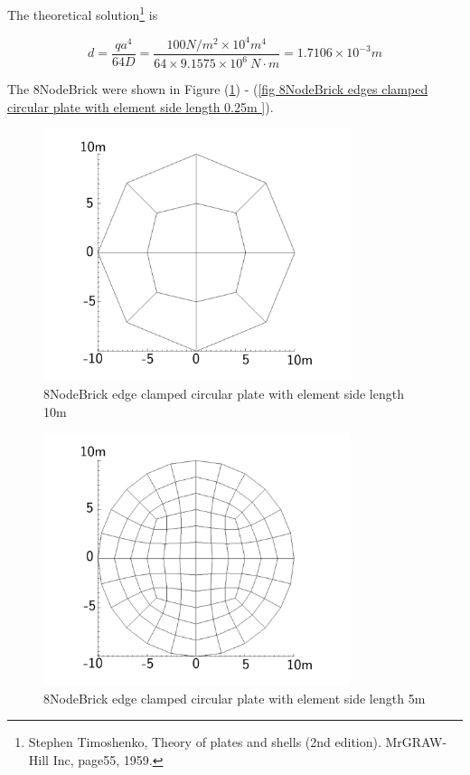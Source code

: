 \documentclass[fleqn,11pt]{article}
\begin{document}
The theoretical solution\footnote{Stephen Timoshenko, Theory of plates and shells (2nd edition). MrGRAW-Hill Inc, page55, 1959.} is 

\begin{equation}
  d= \frac{q a^4}{64D}=\frac{100 N/m^2 \times 10^4 m^4}{64 \times 9.1575 \times 10^6 \ N\cdot m}=1.7106\times 10^{-3} m
\end{equation}



The 8NodeBrick were shown in Figure (\ref{fig 8NodeBrick edges clamped circular plate with element side length 10m }) - (\ref{fig 8NodeBrick edges clamped circular plate with element side length 0.25m }). 




\begin{figure}[H]
  \centering
  \includegraphics[width=9cm]{../Figure-files/circular_plate1.pdf}
  \caption{8NodeBrick edge clamped circular plate with element side length 10m }
  \label{fig 8NodeBrick edges clamped circular plate with element side length 10m }
\end{figure}

\newpage

\begin{figure}[H]
  \centering
  \includegraphics[width=9cm]{../Figure-files/circular_plate2.pdf}
  \caption{8NodeBrick edge clamped circular plate with element side length 5m }
  \label{fig 8NodeBrick edges clamped circular plate with element side length 5m }
\end{figure}
\end{document}
